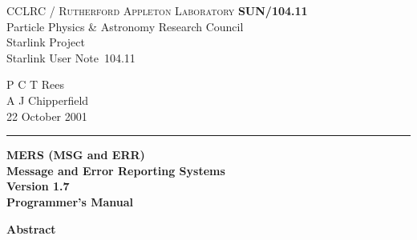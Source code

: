 \documentclass[twoside,11pt]{article}
\newcommand{\stardoccategory}  {Starlink User Note}
\newcommand{\stardocinitials}  {SUN}
\newcommand{\stardocnumber}    {104.11}
\newcommand{\stardocauthors}   {P C T Rees \\
                                A J Chipperfield}
\newcommand{\stardocdate}      {22 October 2001}
\newcommand{\stardoctitle}     {MERS (MSG and ERR)\\ [1ex]
                                Message and Error Reporting Systems}
\newcommand{\stardocversion}   {Version 1.7}
\newcommand{\stardocmanual}    {Programmer's Manual}
\newcommand{\stardocname}{\stardocinitials /\stardocnumber}
\newenvironment{latexonly}{}{}
\renewcommand{\_}{\texttt{\symbol{95}}}
\begin{document}
\thispagestyle{empty}

\begin{latexonly}
   CCLRC / \textsc{Rutherford Appleton Laboratory} \hfill \textbf{\stardocname}\\
   {\large Particle Physics \& Astronomy Research Council}\\
   {\large Starlink Project\\}
   {\large \stardoccategory\ \stardocnumber}
   \begin{flushright}
   \stardocauthors\\
   \stardocdate
   \end{flushright}
   \vspace{-4mm}
   \rule{\textwidth}{0.5mm}
   \vspace{5mm}
   \begin{center}
   {\Huge\textbf{\stardoctitle \\ [2.5ex]}}
   {\LARGE\textbf{\stardocversion \\ [4ex]}}
   {\Huge\textbf{\stardocmanual}}
   \end{center}
   \vspace{5mm}


   \vspace{10mm}
   \begin{center}
      {\Large\textbf{Abstract}}
   \end{center}
\end{latexonly}
\end{document}
